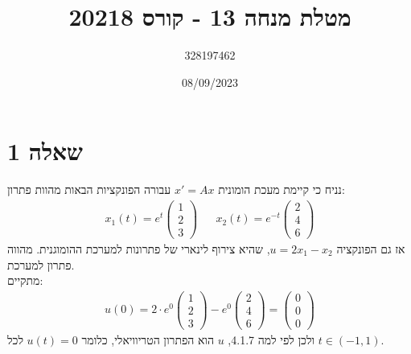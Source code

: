 \documentclass{article}
\title{מטלת מנחה 13 - קורס 20218}
\author{328197462}
\date{08/09/2023}
\begin{document}
\maketitle

\section*{שאלה 1}

נניח כי קיימת מעכת הומונית $x'=Ax$ עבורה הפונקציות הבאות מהוות פתרון:
\begin{align*}
    x_1(t)=e^t\begin{pmatrix}
                  1 \\
                  2 \\
                  3
              \end{pmatrix} &  &
    x_2(t)=e^{-t}\begin{pmatrix}
                     2 \\
                     4 \\
                     6
                 \end{pmatrix}
\end{align*}
אז גם הפונקציה $u=2x_1-x_2$, שהיא צירוף לינארי של פתרונות למערכת ההומוגנית. מהווה פתרון למערכת.\\
מתקיים:
\begin{align*}
    u(0)=2\cdot e^0 \begin{pmatrix}
                        1 \\
                        2 \\
                        3
                    \end{pmatrix} - e^0\begin{pmatrix}
                                           2 \\
                                           4 \\
                                           6
                                       \end{pmatrix} = \begin{pmatrix}
                                                           0 \\
                                                           0 \\
                                                           0
                                                       \end{pmatrix}
\end{align*}
ולכן לפי למה 4.1.7, $u$ הוא הפתרון הטריוויאלי, כלומר $u(t)=0$ לכל $t\in(-1,1)$.
\end{document}
